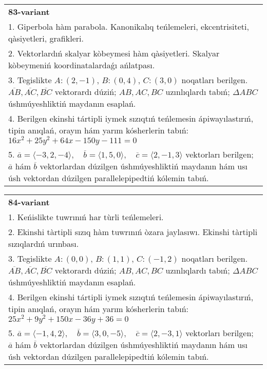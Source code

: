 \documentclass{article}
\begin{document}
\begin{tabular}{m{17cm}}
\textbf{83-variant}\\
1. Giperbola hàm parabola. Kanonikalıq teńlemeleri, ekcentrisiteti, qàsiyetleri, grafikleri.\\

2. Vektorlardıń skalyar kòbeymesi hàm qàsiyetleri. Skalyar kòbeymeniń koordinatalardaǵı ańlatpası.\\

3. Tegislikte $A: (2, -1)$, $B: (0, 4)$, $C: (3, 0)$ noqatları berilgen. $\overline{AB}, \overline{AC}, \overline{BC}$ vektorardı dúziń; $AB, AC, BC$ uzınlıqlardı tabıń; $\Delta ABC$ úshmúyeshliktiń maydanın esaplań. \\

4. Berilgen ekinshi tártipli iymek sızıqtıń teńlemesin ápiwayılastırıń, tipin anıqlań, orayın hám yarım kósherlerin tabıń: $16x^2+25y^2+64x-150y-111=0$\\

5. \(\overline{a} = \langle -3, 2, -4 \rangle, \quad \overline{b} = \langle 1, 5, 0 \rangle, \quad \overline{c} = \langle 2, -1, 3 \rangle\) vektorları berilgen; \(\overline{a}\) hám \(\overline{b}\) vektorlardan dúzilgen úshmúyeshliktiń maydanın hám usı úsh vektordan dúzilgen parallelepipedtiń kólemin tabıń.
\end{tabular}
\vspace{1cm}


\begin{tabular}{m{17cm}}
\textbf{84-variant}\\
1. Keńislikte tuwrınıń har tùrli teńlemeleri. \\

2. Ekinshi tàrtipli sızıq hàm tuwrınıń òzara jaylasıwı. Ekinshi tàrtipli sızıqlardıń urınbası.\\

3. Tegislikte $A: (0, 0)$, $B: (1, 1)$, $C: (-1, 2)$ noqatları berilgen. $\overline{AB}, \overline{AC}, \overline{BC}$ vektorardı dúziń; $AB, AC, BC$ uzınlıqlardı tabıń; $\Delta ABC$ úshmúyeshliktiń maydanın esaplań. \\

4. Berilgen ekinshi tártipli iymek sızıqtıń teńlemesin ápiwayılastırıń, tipin anıqlań, orayın hám yarım kósherlerin tabıń: $25x^2+9y^2+150x-36y+36=0$\\

5. \(\overline{a} = \langle -1, 4, 2 \rangle, \quad \overline{b} = \langle 3, 0, -5 \rangle, \quad \overline{c} = \langle 2, -3, 1 \rangle\) vektorları berilgen; \(\overline{a}\) hám \(\overline{b}\) vektorlardan dúzilgen úshmúyeshliktiń maydanın hám usı úsh vektordan dúzilgen parallelepipedtiń kólemin tabıń.
\end{tabular}
\vspace{1cm}
\end{document}
